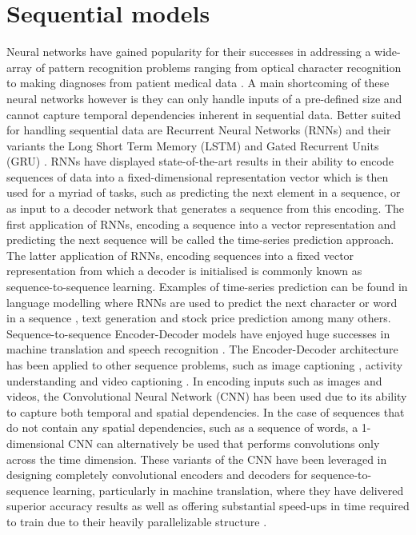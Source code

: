  \section{Sequential models}
 Neural networks have gained popularity for their successes in addressing a wide-array of pattern recognition problems ranging from optical character recognition to making diagnoses from patient medical data \citep{Amato2013}. A main shortcoming of these neural networks however is they can only handle inputs of a pre-defined size and cannot capture temporal dependencies inherent in sequential data. Better suited for handling sequential data are Recurrent Neural Networks (RNNs) and their variants the Long Short Term Memory (LSTM) \citep{Hochreiter1997} and Gated Recurrent Units (GRU) \citep{Cho2014}. RNNs have displayed state-of-the-art results in their ability to encode sequences of data into a fixed-dimensional representation vector which is then used for a myriad of tasks, such as predicting the next element in a sequence, or as input to a decoder network that generates a sequence from this encoding. The first application of RNNs, encoding a sequence into a vector representation and predicting the next sequence will be called the time-series prediction approach. The latter application of RNNs, encoding sequences into a fixed vector representation from which a decoder is initialised is commonly known as sequence-to-sequence learning. Examples of time-series prediction can be found in language modelling where RNNs are used to predict the next character or word in a sequence \citep{mikolov2010recurrent}, text generation \citep{ICML2011Sutskever_524} and stock price prediction \citep{bernal2012financial} among many others. Sequence-to-sequence Encoder-Decoder models have enjoyed huge successes in machine translation \citep{sutskever2014sequence, bahdanau2014neural} and speech recognition \citep{chan2015listen}. The Encoder-Decoder architecture has been applied to other sequence problems, such as image captioning \citep{xu2015show}, activity understanding and video captioning \citep{donahue2015long}. In encoding inputs such as images and videos, the Convolutional Neural Network (CNN) has been used due to its ability to capture both temporal and spatial dependencies. In the case of sequences that do not contain any spatial dependencies, such as a sequence of words, a 1-dimensional CNN can alternatively be used that performs convolutions only across the time dimension. These variants of the CNN have been leveraged in designing completely convolutional encoders and decoders for sequence-to-sequence learning, particularly in machine translation, where they have delivered superior accuracy results as well as offering substantial speed-ups in time required to train due to their heavily parallelizable structure \citep{gehring2017convolutional}.\\


